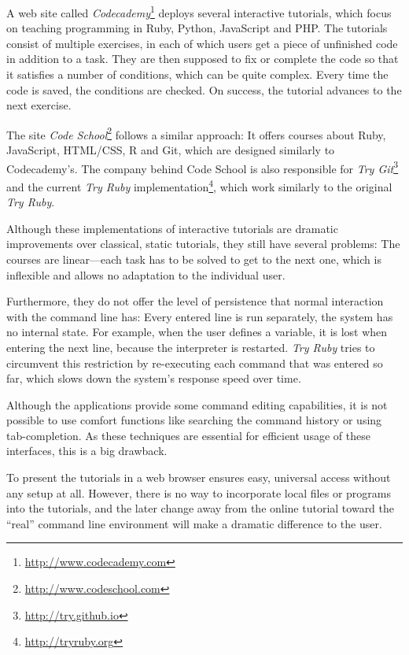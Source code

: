 \documentclass[paper=a4,abstract=on,cleardoublepage=empty,numbers=noenddot,toc=bib,12pt,appendixprefix=true]{scrreprt}
\begin{document}
A web site called \emph{Codecademy}\footnote{\url{http://www.codecademy.com}} deploys several interactive tutorials, which focus on teaching programming in Ruby, Python, JavaScript and PHP. The tutorials consist of multiple exercises, in each of which users get a piece of unfinished code in addition to a task. They are then supposed to fix or complete the code so that it satisfies a number of conditions, which can be quite complex. Every time the code is saved, the conditions are checked. On success, the tutorial advances to the next exercise.

The site \emph{Code School}\footnote{\url{http://www.codeschool.com}} follows a similar approach: It offers courses about Ruby, JavaScript, HTML/CSS, R and Git, which are designed similarly to Codecademy's. The company behind Code School is also responsible for \emph{Try Git}\footnote{\url{http://try.github.io}} and the current \emph{Try Ruby} implementation\footnote{\url{http://tryruby.org}}, which work similarly to the original \emph{Try Ruby}.

Although these implementations of interactive tutorials are dramatic improvements over classical, static tutorials, they still have several problems: The courses are linear---each task has to be solved to get to the next one, which is inflexible and allows no adaptation to the individual user.

Furthermore, they do not offer the level of persistence that normal interaction with the command line has: Every entered line is run separately, the system has no internal state. For example, when the user defines a variable, it is lost when entering the next line, because the interpreter is restarted. \emph{Try Ruby} tries to circumvent this restriction by re-executing each command that was entered so far, which slows down the system's response speed over time.

Although the applications provide some command editing capabilities, it is not possible to use comfort functions like searching the command history or using tab-completion. As these techniques are essential for efficient usage of these interfaces, this is a big drawback.

To present the tutorials in a web browser ensures easy, universal access without any setup at all. However, there is no way to incorporate local files or programs into the tutorials, and the later change away from the online tutorial toward the “real” command line environment will make a dramatic difference to the user.
\end{document}
